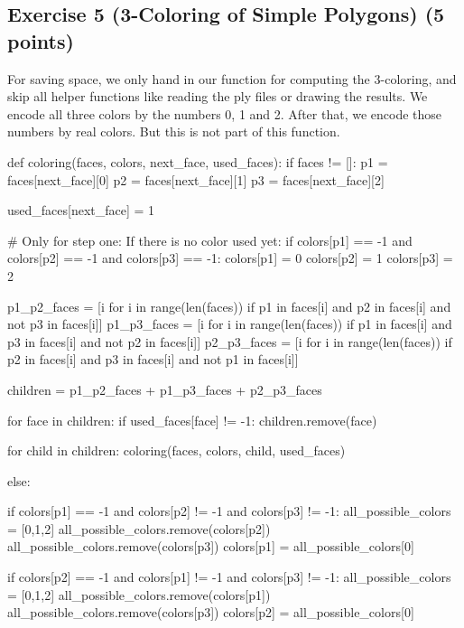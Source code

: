 \documentclass[english, fontsize=12pt, paper=a4, twoside=false, draft=true, pagesize=auto, version=last, DIV=16]{scrartcl}
\theoremstyle{break}
\begin{document}
\begin{landscape}
\section*{Exercise 5 (3-Coloring of Simple Polygons) {\large \hfill (5 points)}} 
For saving space, we only hand in our function for computing the 3-coloring, and skip all helper functions like reading the ply files or drawing the results. We encode all three colors by the numbers 0, 1 and 2. After that, we encode those numbers by real colors. But this is not part of this function. \par
\bigskip

\begin{python}
def coloring(faces, colors, next_face, used_faces):
    if faces != []:
        p1 = faces[next_face][0]
        p2 = faces[next_face][1]
        p3 = faces[next_face][2]

        used_faces[next_face] = 1

        # Only for step one: If there is no color used yet:
        if colors[p1] == -1 and colors[p2] == -1 and colors[p3] == -1:
            colors[p1] = 0
            colors[p2] = 1
            colors[p3] = 2

            p1_p2_faces = [i for i in range(len(faces)) if p1 in faces[i] and p2 in faces[i] and not p3 in faces[i]]
            p1_p3_faces = [i for i in range(len(faces)) if p1 in faces[i] and p3 in faces[i] and not p2 in faces[i]]
            p2_p3_faces = [i for i in range(len(faces)) if p2 in faces[i] and p3 in faces[i] and not p1 in faces[i]]

            children = p1_p2_faces + p1_p3_faces + p2_p3_faces

            for face in children:
                if used_faces[face] != -1:
                    children.remove(face)


            for child in children:
                coloring(faces, colors, child, used_faces)





        else:

            if colors[p1] == -1 and colors[p2] != -1 and colors[p3] != -1:
                all_possible_colors = [0,1,2]
                all_possible_colors.remove(colors[p2])
                all_possible_colors.remove(colors[p3])
                colors[p1] = all_possible_colors[0]

            if colors[p2] == -1 and colors[p1] != -1 and colors[p3] != -1:
                all_possible_colors = [0,1,2]
                all_possible_colors.remove(colors[p1])
                all_possible_colors.remove(colors[p3])
                colors[p2] = all_possible_colors[0]


\end{python}
\end{landscape}
\end{document}
